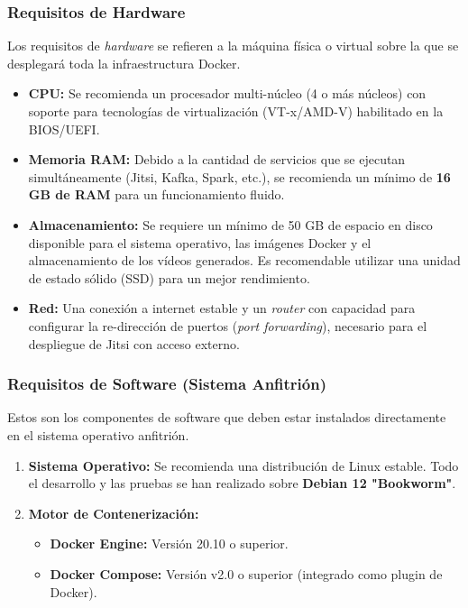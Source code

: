 \subsubsection{Requisitos de Hardware}
Los requisitos de \textit{hardware} se refieren a la máquina física o virtual sobre la que se desplegará toda la infraestructura Docker.
\begin{itemize}
    \item \textbf{CPU:} Se recomienda un procesador multi-núcleo (4 o más núcleos) con soporte para tecnologías de virtualización (VT-x/AMD-V) habilitado en la BIOS/UEFI.
    \item \textbf{Memoria RAM:} Debido a la cantidad de servicios que se ejecutan simultáneamente (Jitsi, Kafka, Spark, etc.), se recomienda un mínimo de \textbf{16 GB de RAM} para un funcionamiento fluido.
    \item \textbf{Almacenamiento:} Se requiere un mínimo de 50 GB de espacio en disco disponible para el sistema operativo, las imágenes Docker y el almacenamiento de los vídeos generados. Es recomendable utilizar una unidad de estado sólido (SSD) para un mejor rendimiento.
    \item \textbf{Red:} Una conexión a internet estable y un \textit{router} con capacidad para configurar la re-dirección de puertos (\textit{port forwarding}), necesario para el despliegue de Jitsi con acceso externo.
\end{itemize}

\subsubsection{Requisitos de Software (Sistema Anfitrión)}
Estos son los componentes de software que deben estar instalados directamente en el sistema operativo anfitrión.
\begin{enumerate}
    \item \textbf{Sistema Operativo:} Se recomienda una distribución de Linux estable. Todo el desarrollo y las pruebas se han realizado sobre \textbf{Debian 12 "Bookworm"}.
    \item \textbf{Motor de Contenerización:}
    \begin{itemize}
        \item \textbf{Docker Engine:} Versión 20.10 o superior.
        \item \textbf{Docker Compose:} Versión v2.0 o superior (integrado como plugin de Docker).
    \end{itemize}
\end{enumerate}


